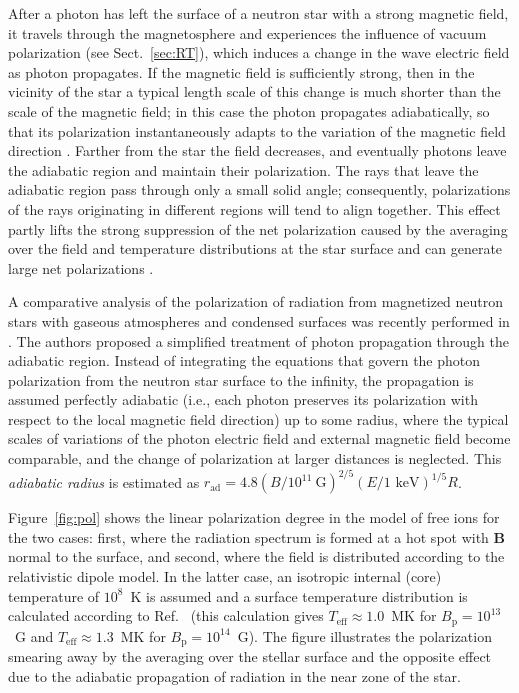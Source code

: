 \documentclass{pos1}
\newcommand{\Teff}{T_\mathrm{eff}}
\begin{document}
After a photon has left the surface of a neutron star with a strong
magnetic field, it travels through the magnetosphere and experiences
the influence of vacuum polarization (see Sect.~\ref{sec:RT}), which
induces a change in the wave electric field as photon propagates. If
the magnetic field is sufficiently strong, then in the vicinity of the star
a typical length scale of this change is much shorter
than the scale of the magnetic field; in this case the photon propagates
adiabatically, so that its polarization instantaneously adapts to the
variation of the magnetic field direction
\cite{HeylShaviv00,HeylShaviv02}. Farther from the star the field
decreases, and eventually photons
leave the adiabatic region and maintain their polarization. The rays
that leave the adiabatic region pass through only a small solid
angle; consequently, polarizations of the rays
originating in different regions will tend to align together.
This effect partly lifts the strong suppression of the net
polarization caused by the averaging over the field and temperature
distributions at the star surface and can generate large net
polarizations \cite{HeilSL03}.

A comparative analysis of the polarization of radiation from
magnetized neutron stars with gaseous atmospheres and condensed
surfaces was recently performed in \cite{GonzalezCaniulef_ea16}. The authors
proposed a simplified treatment of photon propagation through the
adiabatic region. Instead of integrating the equations that govern the
photon polarization from the neutron star surface to the infinity, the
propagation is assumed perfectly adiabatic (i.e., each
photon preserves its polarization with respect to the local magnetic
field direction) up to some radius, where the typical scales of
variations of the photon electric field and external magnetic field
become comparable, and the change of polarization at larger
distances is neglected. This \emph{adiabatic radius} is estimated as
$r_\mathrm{ad}=4.8(B/10^{11}~\mbox{G})^{2/5}(E/\mbox{1 keV})^{1/5}R$.

Figure~\ref{fig:pol} shows the linear polarization degree in the model
of free ions for the two cases: first, where the radiation spectrum is
formed at a hot spot with $\bm{B}$ normal to the surface, and second,
where the field is distributed according to the relativistic dipole
model. In the latter case, an isotropic internal (core) temperature
of $10^8$~K is assumed and a surface temperature distribution is calculated
according to Ref.~\cite{PPP15} (this calculation gives
$\Teff\approx1.0$~MK for $B_\mathrm{p}=10^{13}$~G and
$\Teff\approx1.3$~MK for $B_\mathrm{p}=10^{14}$~G). The figure
illustrates the polarization smearing away by the averaging over the
stellar surface and the opposite effect due to the adiabatic
propagation of radiation in the near zone of the star.
\end{document}
